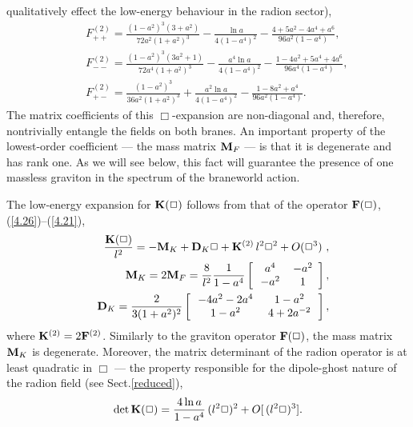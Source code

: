 \documentclass[a4paper,preprint,nofootinbib,
                 showpacs,preprintnumbers,amsmath,amssymb]{revtex4}
\begin{document}
qualitatively effect the low-energy behaviour in the radion  
sector), 
    \begin{eqnarray} 
    &&F^{(2)}_{++} = 
    \frac{(1-a^2)^3(3+a^2)}{72a^2(1+a^2)^3} 
    -\frac{\ln a}{4(1-a^4)^2}- 
    \frac{4+5a^2-4a^4+a^6}{96a^2(1-a^4)},\nonumber\\ 
    &&F^{(2)}_{--} = 
    \frac{(1-a^2)^3(3a^2+1)}{72a^4(1+a^2)^3} 
    -\frac{a^4\ln a}{4(1-a^4)^2} 
    -\frac{1-4a^2+5a^4+4a^6}{96a^4(1-a^4)},\nonumber\\ 
    &&F^{(2)}_{+-} = 
    \frac{(1-a^2)^3}{36a^2(1+a^2)^3} 
    +\frac{a^2\ln a}{4(1-a^4)^2} 
    -\frac{1-8a^2+a^4}{96a^2(1-a^4)}.   \label{4.21} 
    \end{eqnarray} 
The matrix coefficients of this $\Box$-expansion are non-diagonal 
and, therefore, nontrivially entangle the fields on both branes.  
An important property of the lowest-order coefficient --- the mass  
matrix ${\bf M}_F$ --- is that it is degenerate and has rank one. As  
we will see below, this fact will guarantee the presence of one  
massless graviton in the spectrum of the braneworld action. 
 
The low-energy expansion for ${\bf K}(\Box)$ follows from that of  
the operator ${\bf F}(\Box)$, (\ref{4.26})--(\ref{4.21}), 
    \begin{eqnarray} 
    &&\frac{{\bf K}(\Box)}{l^2}=-{\bf M}_K+ 
    {\bf D}_K \Box 
    +{\bf K}^{(2)}\,l^2\Box^2+O(\Box^3)\ ,  \label{7.3.3}\\ 
    &&{\bf M}_K=2{\bf M}_F= 
    \frac8{l^2}\frac1{1-a^4} 
    \left[\begin{array}{cc} 
    \,\,a^4\, & \,-a^2 \\ 
    \,-a^2 & \,\,1\,\end{array}\right],   \label{7.3.4}\\ 
    &&{\bf D}_K=\frac2{3(1+a^2)^2} 
    \left[\begin{array}{cc} 
    \,-4a^2-2a^4\, & 1-a^2 \\ 
    1-a^2 & \,4+2a^{-2}\, 
    \end{array}\right],                 \label{4.22} 
    \end{eqnarray} 
where ${\bf K}^{(2)}=2{\bf F}^{(2)}$. Similarly to the graviton 
operator ${\bf F}(\Box)$, the mass matrix ${\bf M}_K$ is 
degenerate. Moreover, the matrix determinant of the radion operator 
is at least quadratic in $\Box$ --- the property  
responsible for the dipole-ghost nature of the radion field (see  
Sect.\ref{reduced}), 
    \begin{eqnarray} 
    \det{\bf K}(\Box)= 
    \frac{4\ln a}{1-a^4}\,(l^2\Box)^2 
    +O[\,(l^2\Box)^3].                \label{7.3.5} 
    \end{eqnarray} 
  
\end{document}
